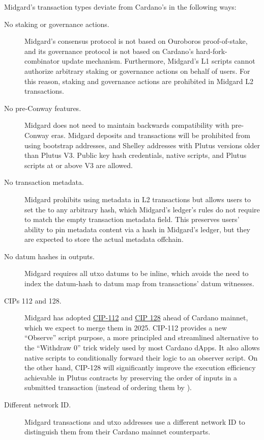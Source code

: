 \documentclass[../midgard.tex]{subfiles}
\begin{document}
Midgard's transaction types deviate from Cardano's in the following ways:
\begin{description}
    \item[No staking or governance actions.] Midgard's consensus protocol is not based on Ouroboros proof-of-stake, and its governance protocol is not based on Cardano's hard-fork-combinator update mechanism.
      Furthermore, Midgard's L1 scripts cannot authorize arbitrary staking or governance actions on behalf of users.
      For this reason, staking and governance actions are prohibited in Midgard L2 transactions.
    \item[No pre-Conway features.] Midgard does not need to maintain backwards compatibility with pre-Conway eras.
      Midgard deposits and transactions will be prohibited from using bootstrap addresses, and Shelley addresses with Plutus versions older than Plutus V3.
      Public key hash credentials, native scripts, and Plutus scripts at or above V3 are allowed.
    \item[No transaction metadata.] Midgard prohibits using metadata in L2 transactions but allows users to set the  to any arbitrary hash, which Midgard's ledger's rules do not require to match the empty transaction metadata field.
      This preserves users' ability to pin metadata content via a hash in Midgard's ledger, but they are expected to store the actual metadata offchain.
    \item[No datum hashes in outputs.] Midgard requires all utxo datums to be inline, which avoids the need to index the datum-hash to datum map from transactions' datum witnesses.
    \item[CIPs 112 and 128.] Midgard has adopted \href{https://github.com/cardano-foundation/CIPs/tree/master/CIP-0112}{CIP-112} and \href{https://github.com/cardano-foundation/CIPs/tree/master/CIP-0128}{CIP 128} ahead of Cardano mainnet, which we expect to merge them in 2025.
      CIP-112 provides a new ``Observe'' script purpose, a more principled and streamlined alternative to the ``Withdraw 0'' trick widely used by most Cardano dApps.
      It also allows native scripts to conditionally forward their logic to an observer script.
      On the other hand, CIP-128 will significantly improve the execution efficiency achievable in Plutus contracts by preserving the order of inputs in a submitted transaction (instead of ordering them by ).
    \item[Different network ID.] Midgard transactions and utxo addresses use a different network ID to distinguish them from their Cardano mainnet counterparts.

\end{description}
\end{document}
